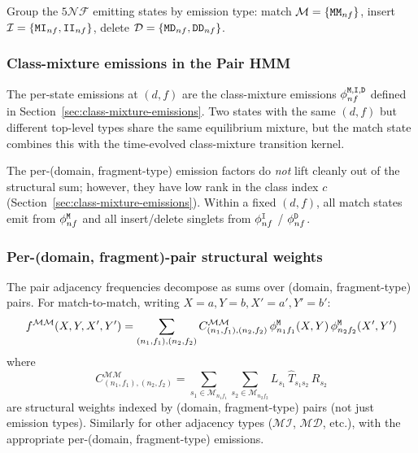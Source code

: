 \documentclass{article}
\newcommand\dom{n}
\newcommand\ndom{\mathcal{N}}
\newcommand\nfrag{\mathcal{F}}
\newcommand\anctok{a}
\newcommand\destok{b}
\newcommand\mat{{\tt M}}
\newcommand\ins{{\tt I}}
\newcommand\del{{\tt D}}
\newcommand\effT{\hat{T}}
\newcommand\frag{f}
\newcommand\class{c}
\begin{document}
Group the $5\ndom\nfrag$ emitting states by emission type:
match $\mathcal{M} = \{\mat\mat_{\dom\frag}\}$,
insert $\mathcal{I} = \{\mat\ins_{\dom\frag}, \ins\ins_{\dom\frag}\}$,
delete $\mathcal{D} = \{\mat\del_{\dom\frag}, \del\del_{\dom\frag}\}$.

\subsubsection{Class-mixture emissions in the Pair HMM}

The per-state emissions at $(d,f)$ are the class-mixture emissions
$\phi^{\mat,\ins,\del}_{\dom\frag}$ defined in
Section~\ref{sec:class-mixture-emissions}. Two states with the same
$(d,f)$ but different top-level types share the same equilibrium
mixture, but the match state combines this with the time-evolved
class-mixture transition kernel.

The per-(domain, fragment-type) emission factors do \emph{not} lift
cleanly out of the structural sum; however, they have low rank in the
class index $\class$ (Section~\ref{sec:class-mixture-emissions}).
Within a fixed $(d,f)$, all match states emit from
$\phi^{\mat}_{\dom\frag}$ and all insert/delete singlets from
$\phi^{\ins}_{\dom\frag}$ / $\phi^{\del}_{\dom\frag}$.

\subsubsection{Per-(domain, fragment)-pair structural weights}

The pair adjacency frequencies decompose as sums over
(domain, fragment-type) pairs.
For match-to-match, writing
$X = \anctok, Y = \destok, X' = \anctok', Y' = \destok'$:
\begin{equation}\label{eq:pair-adj}
f^{\mathcal{M}\mathcal{M}}(X,Y,X',Y')
= \sum_{(\dom_1,\frag_1),(\dom_2,\frag_2)}
  C^{\mathcal{M}\mathcal{M}}_{(\dom_1,\frag_1),(\dom_2,\frag_2)}\,
  \phi^{\mat}_{\dom_1\frag_1}(X,Y)\,
  \phi^{\mat}_{\dom_2\frag_2}(X',Y')
\end{equation}
where
\[
C^{\mathcal{M}\mathcal{M}}_{(\dom_1,\frag_1),(\dom_2,\frag_2)}
= \sum_{s_1 \in \mathcal{M}_{\dom_1\frag_1}} \sum_{s_2 \in \mathcal{M}_{\dom_2\frag_2}}
  L_{s_1}\, \effT_{s_1 s_2}\, R_{s_2}
\]
are structural weights indexed by (domain, fragment-type) pairs (not
just emission types). Similarly for other adjacency types
($\mathcal{M}\mathcal{I}$, $\mathcal{M}\mathcal{D}$, etc.), with
the appropriate per-(domain, fragment-type) emissions.
\end{document}
